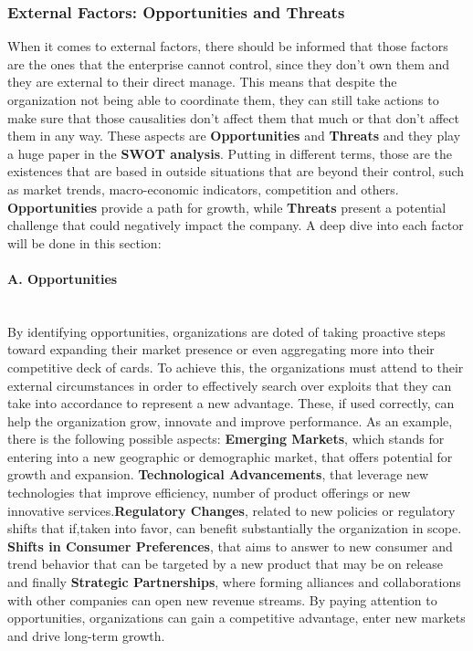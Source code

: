 \subsubsection{External Factors: Opportunities and Threats}
When it comes to external factors, there should be informed that those factors are the ones that the enterprise cannot control, since they don't own them and they are external to their direct manage. This means that despite the organization not being able to coordinate them, they can still take actions to make sure that those causalities don't affect them that much or that don't affect them in any way. These aspects are \textbf{Opportunities} and \textbf{Threats} and they play a huge paper in the \textbf{SWOT analysis}. Putting in different terms, those are the existences that are based in outside situations that are beyond their control, such as market trends, macro-economic indicators, competition and others. \textbf{Opportunities} provide a path for growth, while \textbf{Threats} present a potential challenge that could negatively impact the company.
A deep dive into each factor will be done in this section:

\paragraph{A. Opportunities}\mbox{}\\
By identifying opportunities, organizations are doted of taking proactive steps toward expanding their market presence or even aggregating more into their competitive deck of cards. To achieve this, the organizations must attend to their external circumstances in order to effectively search over exploits that they can take into accordance to represent a new advantage. These, if used correctly, can help the organization grow, innovate and improve performance.
As an example, there is the following possible aspects: \textbf{Emerging Markets}, which stands for entering into a new geographic or demographic market, that offers potential for growth and expansion. \textbf{Technological Advancements}, that leverage new technologies that improve efficiency, number of product offerings or new innovative services.\textbf{Regulatory Changes}, related to new policies or regulatory shifts that if,taken into favor, can benefit substantially the organization in scope. \textbf{Shifts in Consumer Preferences}, that aims to answer to new consumer and trend behavior that can be targeted by a new product that may be on release and finally \textbf{Strategic Partnerships}, where forming alliances and collaborations with other companies can open new revenue streams.
By paying attention to opportunities, organizations can gain a competitive advantage, enter new markets and drive long-term growth.

